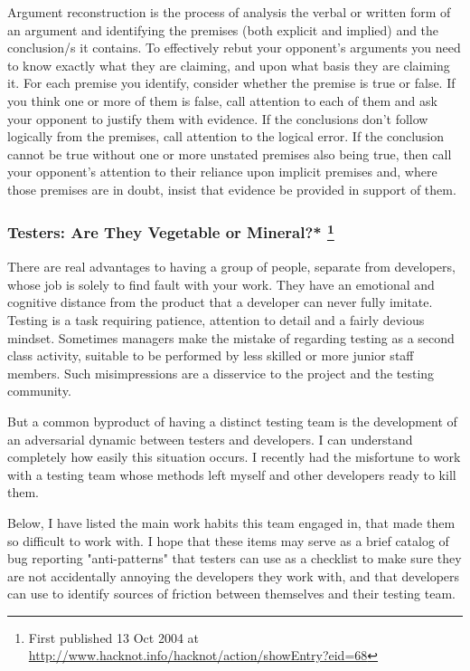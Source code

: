 \documentclass{article}
\begin{document}
\begin{enumerate}
Argument reconstruction is the process of analysis the verbal or written
form of an argument and identifying the premises (both explicit and
implied) and the conclusion/s it contains. To effectively rebut your
opponent's arguments you need to know exactly what they are claiming,
and upon what basis they are claiming it. For each premise you identify,
consider whether the premise is true or false. If you think one or more
of them is false, call attention to each of them and ask your opponent
to justify them with evidence. If the conclusions don't follow logically
from the premises, call attention to the logical error. If the
conclusion cannot be true without one or more unstated premises also
being true, then call your opponent's attention to their reliance upon
implicit premises and, where those premises are in doubt, insist that
evidence be provided in support of them.
\end{enumerate}

\subsubsection{Testers: Are They Vegetable or Mineral?*  \footnote{First published 13 Oct 2004 at
\url{http://www.hacknot.info/hacknot/action/showEntry?eid=68}}}
\label{sec:orgheadline102}

There are real advantages to having a group of people, separate from
developers, whose job is solely to find fault with your work. They have
an emotional and cognitive distance from the product that a developer
can never fully imitate. Testing is a task requiring patience, attention
to detail and a fairly devious mindset. Sometimes managers make the
mistake of regarding testing as a second class activity, suitable to be
performed by less skilled or more junior staff members. Such
misimpressions are a disservice to the project and the testing
community.

But a common byproduct of having a distinct testing team is the
development of an adversarial dynamic between testers and developers. I
can understand completely how easily this situation occurs. I recently
had the misfortune to work with a testing team whose methods left myself
and other developers ready to kill them.

Below, I have listed the main work habits this team engaged in, that
made them so difficult to work with. I hope that these items may serve
as a brief catalog of bug reporting "anti-patterns" that testers can use
as a checklist to make sure they are not accidentally annoying the
developers they work with, and that developers can use to identify
sources of friction between themselves and their testing team.
\end{document}
